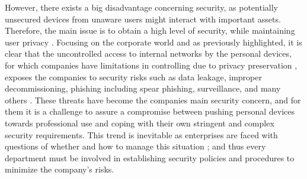 \documentclass[a4paper,10pt,twocolumn,preprint,3p]{elsarticle}
\begin{document}

However, there exists a big disadvantage concerning security, as
potentially unsecured devices from unaware users might interact with
important assets. Therefore, the main issue is to obtain a high level
of security, while maintaining user privacy \cite{miller2012byod}.
Focusing on the corporate world and as previously highlighted,
it is clear that the uncontrolled access to internal networks by the
personal devices, for which companies have limitations in
controlling due to privacy preservation \cite{miller2012byod}, exposes the companies to security risks such as data
leakage, improper decommissioning, phishing including spear phishing, surveillance, and many
others \cite{lennon2012changing}. These threats have become the
companies main security concern, and for them it is a challenge to
assure a compromise between pushing personal devices towards
professional use and coping with their own stringent and complex
security requirements. This trend is inevitable as enterprises are
faced with questions of whether and how to manage this situation \cite{thomson2012byod}; and
thus every department must be involved in establishing security
policies and procedures to minimize the company's risks.
\end{document}
